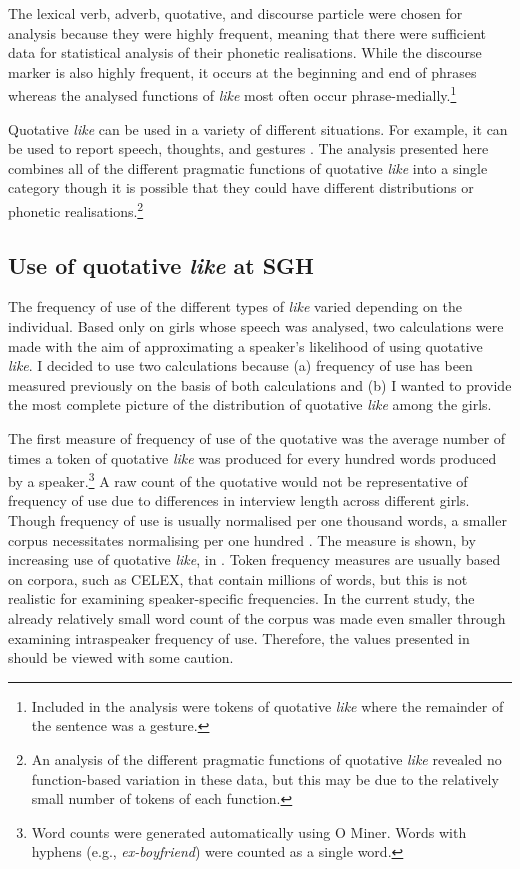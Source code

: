 \noindent The lexical verb, adverb, quotative, and discourse particle were chosen for analysis because they were highly frequent, meaning that there were sufficient data for statistical analysis of their phonetic realisations. While the discourse marker is also highly frequent, it occurs at the beginning and end of phrases whereas the analysed functions of \textit{like} most often occur phrase-medially.\footnote{Included in the analysis were tokens of quotative \textit{like} where the remainder of the sentence was a gesture.}

Quotative \textit{like} can be used in a variety of different situations. For example, it can be used to report speech, thoughts, and gestures \citep{romainelange1991}. The analysis presented here combines all of the different pragmatic functions of quotative \textit{like} into a single category though it is possible that they could have different distributions or phonetic realisations.\footnote{An analysis of the different pragmatic functions of quotative \textit{like} revealed no function-based variation in these data, but this may be due to the relatively small number of tokens of each function.}



\subsection{Use of quotative \textit{like} at SGH}\label{section:uselike}



The frequency of use of the different types of \textit{like} varied depending on the individual. Based only on girls whose speech was analysed, two calculations were made with the aim of approximating a speaker's likelihood of using quotative \textit{like}. I decided to use two calculations because (a) frequency of use has been measured previously on the basis of both calculations and (b) I wanted to provide the most complete picture of the distribution of quotative \textit{like} among the girls.

The first measure of frequency of use of the quotative was the average number of times a token of quotative \textit{like} was produced for every hundred words produced by a speaker.\footnote{Word counts were generated automatically using O Miner. Words with hyphens (e.g., \textit{ex-boyfriend}) were counted as a single word.} A raw count of the quotative would not be representative of frequency of use due to differences in interview length across different girls. Though frequency of use is usually normalised per one thousand words, a smaller corpus necessitates normalising per one hundred \citep[264]{biberetal1998}. The measure is shown, by increasing use of quotative \textit{like}, in . Token frequency measures are usually based on corpora, such as CELEX, that contain millions of words, but this is not realistic for examining speaker-specific frequencies. In the current study, the already relatively small word count of the corpus was made even smaller through examining intraspeaker frequency of use. Therefore, the values presented in  should be viewed with some caution.
 
